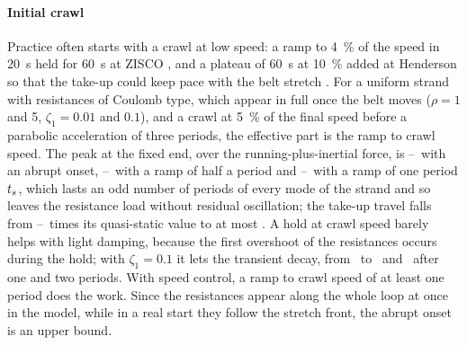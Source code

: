 \paragraph{Initial crawl} Practice often starts with a crawl at low speed: a ramp to
\qty{4}{\percent} of the speed in \qty{20}{\second} held for \qty{60}{\second} at ZISCO
\citep{nordell1997zisco}, and a plateau of \qty{60}{\second} at \qty{10}{\percent} added at
Henderson so that the take-up could keep pace with the belt stretch \citep{kung2005henderson}.
For a uniform strand with resistances of Coulomb type, which appear in full once the belt moves
($\rho=1$ and 5, $\zeta_1=0.01$ and $0.1$), and a crawl at \qty{5}{\percent} of the final speed
before a parabolic acceleration of three periods, the effective part is the ramp to crawl
speed. The peak at the fixed end, over the running-plus-inertial force, is
\NumCrawlAbruptMin--\NumCrawlAbruptMax\ with an abrupt onset,
\NumCrawlRampHalfMin--\NumCrawlRampHalfMax\ with a ramp of half a period and
\NumCrawlRampOneMin--\NumCrawlRampOneMax\ with a ramp of one period $t_{s}$, which lasts an
odd number of periods of every mode of the strand and so leaves the resistance load without
residual oscillation; the take-up travel falls from
\NumCrawlTravelAbruptMin--\NumCrawlTravelAbruptMax\ times its quasi-static value to at most
\NumCrawlTravelRampOneMax. A hold at crawl speed barely helps with light damping, because the
first overshoot of the resistances occurs during the hold; with $\zeta_1=0.1$ it lets the
transient decay, from \NumCrawlHoldDampedZero\ to \NumCrawlHoldDampedOne\ and
\NumCrawlHoldDampedTwo\ after one and two periods. With speed control, a ramp to crawl speed of
at least one period does the work. Since the resistances appear along the whole loop at once in
the model, while in a real start they follow the stretch front, the abrupt onset is an upper
bound.
